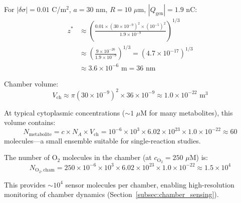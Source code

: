 \documentclass[twocolumn,10pt,aps,prd,superscriptaddress,floatfix,nofootinbib]{revtex4-2}
\theoremstyle{remark}
\begin{document}
For $|\delta\sigma| = 0.01$ C/m$^2$, $a = 30$ nm, $R = 10$ $\mu$m, $|Q_{\mathrm{gen}}| = 1.9$ nC:
\begin{align}
z^* &\approx \left(\frac{0.01 \times (30 \times 10^{-9})^2 \times (10^{-5})^2}{1.9 \times 10^{-9}}\right)^{1/3} \nonumber \\
&\approx \left(\frac{9 \times 10^{-26}}{1.9 \times 10^{-9}}\right)^{1/3} = (4.7 \times 10^{-17})^{1/3} \nonumber \\
&\approx 3.6 \times 10^{-6} \text{ m} = 36 \text{ nm}
\end{align}

Chamber volume:
\begin{equation}
V_{\mathrm{ch}} \approx \pi (30 \times 10^{-9})^2 \times 36 \times 10^{-9} \approx 1.0 \times 10^{-22} \text{ m}^3
\end{equation}

At typical cytoplasmic concentrations ($\sim 1$ $\mu$M for many metabolites), this volume contains:
\begin{equation}
N_{\mathrm{metabolite}} = c \times N_A \times V_{\mathrm{ch}} = 10^{-6} \times 10^{3} \times 6.02 \times 10^{23} \times 1.0 \times 10^{-22} \approx 60
\end{equation}
molecules---a small ensemble suitable for single-reaction studies.

The number of O$_2$ molecules in the chamber (at $c_{\mathrm{O_2}} = 250$ $\mu$M) is:
\begin{equation}
N_{\mathrm{O_2,cham}} = 250 \times 10^{-6} \times 10^{3} \times 6.02 \times 10^{23} \times 1.0 \times 10^{-22} \approx 1.5 \times 10^{4}
\end{equation}

This provides $\sim 10^4$ sensor molecules per chamber, enabling high-resolution monitoring of chamber dynamics (Section~\ref{subsec:chamber_sensing}).
\end{document}
